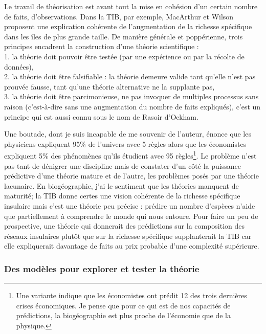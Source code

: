 Le travail de théorisation est avant tout la mise en cohésion d'un
certain nombre de faits, d'observations. Dans la TIB, par exemple,
MacArthur et Wilson proposent une explication cohérente de
l'augmentation de la richesse spécifique dans les îles de plus grande
taille. De manière générale et poppérienne, trois principes encadrent la
construction d'une théorie scientifique :\\
1. la théorie doit pouvoir être testée (par une expérience ou par la
récolte de données),\\
2. la théorie doit être falsifiable : la théorie demeure valide tant
qu'elle n'est pas prouvée fausse, tant qu'une théorie alternative ne la
supplante pas,\\
3. la théorie doit être parcimonieuse, ne pas invoquer de multiples
processus sans raison (c'est-à-dire sans une augmentation du nombre de
faits expliqués), c'est un principe qui est aussi connu sous le nom de
Rasoir d'Ockham.

Une boutade, dont je suis incapable de me souvenir de l'auteur, énonce
que les physiciens expliquent 95\% de l'univers avec 5 règles alors que
les économistes expliquent 5\% des phénomènes qu'ils étudient avec 95
règles\footnote{Une variante indique que les économistes ont prédit 12
  des trois dernières crises économiques. Je pense que pour ce qui est
  de nos capacités de prédictions, la biogéographie est plus proche de
  l'économie que de la physique.}. Le problème n'est pas tant de
dénigrer une discipline mais de constater d'un côté la puissance
prédictive d'une théorie mature et de l'autre, les problèmes posés par
une théorie lacunaire. En biogéographie, j'ai le sentiment que les
théories manquent de maturité; la TIB donne certes une vision cohérente
de la richesse spécifique insulaire mais c'est une théorie peu précise :
prédire un nombre d'espèces n'aide que partiellement à comprendre le
monde qui nous entoure. Pour faire un peu de prospective, une théorie
qui donnerait des prédictions sur la composition des réseaux insulaires
plutôt que sur la richesse spécifique supplanterait la TIB car elle
expliquerait davantage de faits au prix probable d'une complexité
supérieure.

\subsubsection*{Des modèles pour explorer et tester la
théorie}\label{des-moduxe8les-pour-explorer-et-tester-la-thuxe9orie}

